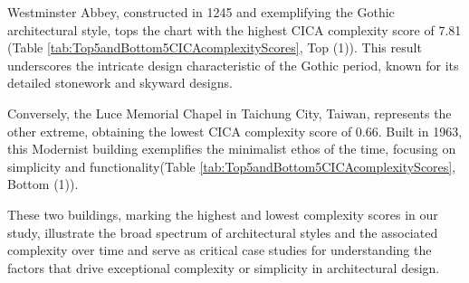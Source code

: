 Westminster Abbey, constructed in 1245 and exemplifying the Gothic architectural style, tops the chart with the highest CICA complexity score of 7.81 (Table \ref{tab:Top5andBottom5CICAcomplexityScores}, Top (1)).
This result underscores the intricate design characteristic of the Gothic period, known for its detailed stonework and skyward designs\cite{Stacbond2020}.

Conversely, the Luce Memorial Chapel in Taichung City, Taiwan, represents the other extreme, obtaining the lowest CICA complexity score of 0.66.
Built in 1963, this Modernist building exemplifies the minimalist ethos of the time, focusing on simplicity and functionality(Table \ref{tab:Top5andBottom5CICAcomplexityScores}, Bottom (1)).

These two buildings, marking the highest and lowest complexity scores in our study, illustrate the broad spectrum of architectural styles and the associated complexity over time and serve as critical case studies for understanding the factors that drive exceptional complexity or simplicity in architectural design.



%



